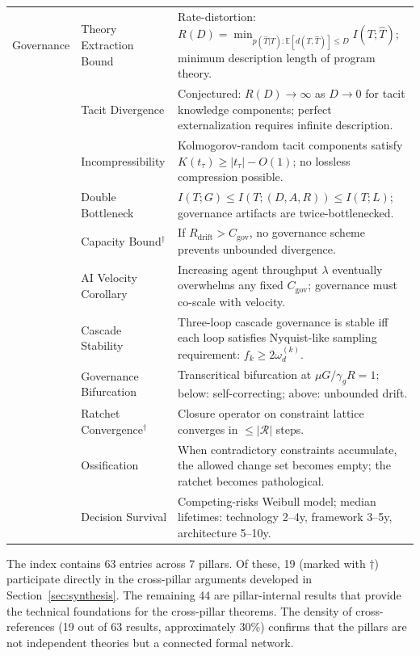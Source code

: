 \documentclass[11pt, a4paper, logo, copyright]{googledeepmind}
\begin{document}
\begin{appendices}
\begin{longtable}{p{1.6cm}p{3.2cm}p{7.8cm}}
Governance
    & Theory Extraction Bound & Rate-distortion: $R(D) = \min_{p(\hat{T}|T): \mathbb{E}[d(T,\hat{T})] \leq D} I(T;\hat{T})$; minimum description length of program theory. \\
    & Tacit Divergence & Conjectured: $R(D) \to \infty$ as $D \to 0$ for tacit knowledge components; perfect externalization requires infinite description. \\
    & Incompressibility & Kolmogorov-random tacit components satisfy $K(t_\tau) \geq |t_\tau| - O(1)$; no lossless compression possible. \\
    & Double Bottleneck & $I(T;G) \leq I(T;(D,A,R)) \leq I(T;L)$; governance artifacts are twice-bottlenecked. \\
    & Capacity Bound$^\dagger$ & If $R_{\text{drift}} > C_{\text{gov}}$, no governance scheme prevents unbounded divergence. \\
    & AI Velocity Corollary & Increasing agent throughput $\lambda$ eventually overwhelms any fixed $C_{\text{gov}}$; governance must co-scale with velocity. \\
    & Cascade Stability & Three-loop cascade governance is stable iff each loop satisfies Nyquist-like sampling requirement: $f_k \geq 2\omega_d^{(k)}$. \\
    & Governance Bifurcation & Transcritical bifurcation at $\mu G / \gamma_g R = 1$; below: self-correcting; above: unbounded drift. \\
    & Ratchet Convergence$^\dagger$ & Closure operator on constraint lattice converges in $\leq |\mathcal{R}|$ steps. \\
    & Ossification & When contradictory constraints accumulate, the allowed change set becomes empty; the ratchet becomes pathological. \\
    & Decision Survival & Competing-risks Weibull model; median lifetimes: technology 2--4y, framework 3--5y, architecture 5--10y. \\

\bottomrule
\end{longtable}
\normalsize

The index contains 63 entries across 7 pillars. Of these, 19 (marked with $\dagger$) participate directly in the cross-pillar arguments developed in Section~\ref{sec:synthesis}. The remaining 44 are pillar-internal results that provide the technical foundations for the cross-pillar theorems. The density of cross-references (19 out of 63 results, approximately 30\%) confirms that the pillars are not independent theories but a connected formal network.


\end{appendices}
\end{document}

